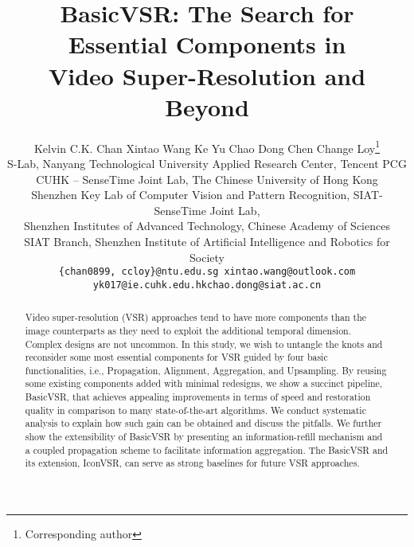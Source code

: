 \documentclass[final]{cvpr}
\begin{document}
\title{BasicVSR: The Search for Essential Components in \\ Video Super-Resolution and Beyond}

\author{Kelvin C.K. Chan
\quad
Xintao Wang
\quad
Ke Yu
\quad
Chao Dong
\quad
Chen Change Loy\thanks{Corresponding author}\\
S-Lab, Nanyang Technological University\quad
Applied Research Center, Tencent PCG\\
CUHK – SenseTime Joint Lab, The Chinese University of Hong Kong\\
Shenzhen Key Lab of Computer Vision and Pattern Recognition, SIAT-SenseTime Joint Lab,\\Shenzhen Institutes of Advanced Technology, Chinese Academy of Sciences\\
SIAT Branch, Shenzhen Institute of Artificial Intelligence and Robotics for Society\\
{\tt\small \{chan0899, ccloy\}@ntu.edu.sg \hspace{1cm} xintao.wang@outlook.com}\\
{\tt\small yk017@ie.cuhk.edu.hk\hspace{1cm}chao.dong@siat.ac.cn}\\\vspace{-1cm}
}
\maketitle
\pagestyle{empty}
\thispagestyle{empty}

\begin{abstract}
	Video super-resolution (VSR) approaches tend to have more components than the image counterparts as they need to exploit the additional temporal dimension. Complex designs are not uncommon. In this study, we wish to untangle the knots and reconsider some most essential components for VSR guided by four basic functionalities, i.e., Propagation, Alignment, Aggregation, and Upsampling. By reusing some existing components added with minimal redesigns, we show a succinct pipeline, BasicVSR, that achieves appealing  improvements in terms of speed and restoration quality in comparison to many state-of-the-art algorithms. We conduct systematic analysis to explain how such gain can be obtained and discuss the pitfalls. We further show the extensibility of BasicVSR by presenting an information-refill mechanism and a coupled propagation scheme to facilitate information aggregation. The BasicVSR and its extension, IconVSR, can serve as strong baselines for future VSR approaches.
\end{abstract}
\vspace{-0.45cm}
\end{document}
